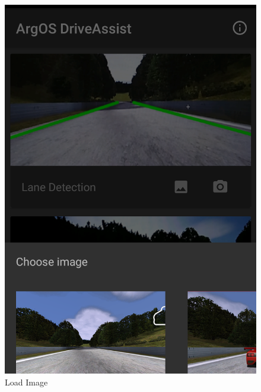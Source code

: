 \begin{figure}[H]
	\includegraphics[width=\linewidth]{images/screenshot_load_image.png}
	\caption{Load Image}\label{fig:load_image}
	\endminipage\hfill

\end{figure}
